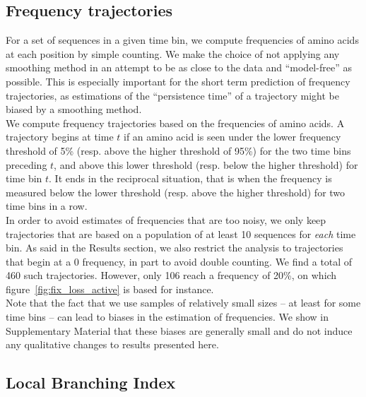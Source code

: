 \documentclass[reprint,amsmath,amssymb,superscriptaddress,showpacs,rmp]{revtex4-1}
\begin{document}
\subsection*{Frequency trajectories} %
\label{sub:frequency_trajectories}

	For a set of sequences in a given time bin, we compute frequencies of amino acids at each position by simple counting. We make the choice of not applying any smoothing method in an attempt to be as close to the data and ``model-free'' as possible. This is especially important for the short term prediction of frequency trajectories, as estimations of the ``persistence time'' of a trajectory might be biased by a smoothing method. \\
	We compute frequency trajectories based on the frequencies of amino acids. A trajectory begins at time $t$ if an amino acid is seen under the lower frequency threshold of 5\% (resp. above the higher threshold of 95\%) for the two time bins preceding $t$, and above this lower threshold (resp. below the higher threshold) for time bin $t$. It ends in the reciprocal situation, that is when the frequency is measured below the lower threshold (resp. above the higher threshold) for two time bins in a row. \\
	In order to avoid estimates of frequencies that are too noisy, we only keep trajectories that are based on a population of at least 10 sequences for \emph{each} time bin. As said in the Results section, we also restrict the analysis to trajectories that begin at a $0$ frequency, in part to avoid double counting. We find a total of 460 such trajectories. However, only 106 reach a frequency of 20\%, on which figure~\ref{fig:fix_loss_active} is based for instance.  \\
	Note that the fact that we use samples of relatively small sizes -- at least for some time bins -- can lead to biases in the estimation of frequencies. We show in Supplementary Material that these biases are generally small and do not induce any qualitative changes to results presented here.


\subsection*{Local Branching Index} %
\label{sub:local_branching_index}
\end{document}
